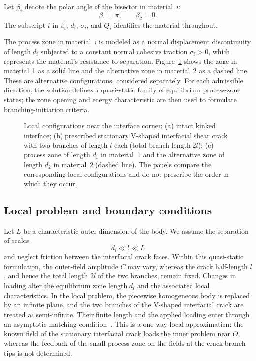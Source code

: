 Let $\beta_i$ denote the polar angle of the bisector in material~$i$:
\begin{equation*}
  \beta_1=\pi,\qquad \beta_2=0.
\end{equation*}
The subscript $i$ in $\beta_i$, $d_i$, $\sigma_i$, and $Q_i$ identifies
the material throughout.

The process zone in material~$i$ is modeled as a normal displacement
discontinuity of length $d_i$ subjected to a constant normal cohesive
traction $\sigma_i>0$, which represents the material's resistance to
separation. Figure~\ref{fig:failure-stages} shows the zone in material~1
as a solid line and the alternative zone in material~2 as a dashed line.
These are alternative configurations, considered separately. For each
admissible direction, the solution defines a quasi-static family of
equilibrium process-zone states; the zone opening and energy characteristic
are then used to formulate branching-initiation criteria.

\begin{figure}[htbp]
  \centering
  
  \caption{Local configurations near the interface corner:
  (a) intact kinked interface; (b) prescribed stationary V-shaped
  interfacial shear crack with two branches of length $l$ each (total branch
  length $2l$); (c) process zone of length $d_1$
  in material~1 and the alternative zone of length $d_2$ in material~2
  (dashed line). The panels compare the corresponding local configurations
  and do not prescribe the order in which they occur.}
  \label{fig:failure-stages}
\end{figure}

\subsection{Local problem and boundary conditions}
\label{subsec:boundary-conditions}

Let $L$ be a characteristic outer dimension of the body. We assume the
separation of scales
\begin{equation*}
  d_i\ll l\ll L
\end{equation*}
and neglect friction between the interfacial crack faces. Within this
quasi-static formulation, the outer-field amplitude $C$ may vary, whereas
the crack half-length $l$, and hence the total length $2l$ of the two
branches, remain fixed. Changes in loading alter the equilibrium zone length
$d_i$ and the associated local characteristics. In the local problem, the
piecewise homogeneous body is replaced by an infinite plane, and the two
branches of the V-shaped interfacial crack are treated as semi-infinite.
Their finite length and the applied loading enter through an asymptotic
matching condition~\cite{Nayfeh1973Perturbation}. This is a one-way local
approximation: the known field of the stationary interfacial crack loads the
inner problem near $O$, whereas the feedback of the small process zone on
the fields at the crack-branch tips is not determined.

